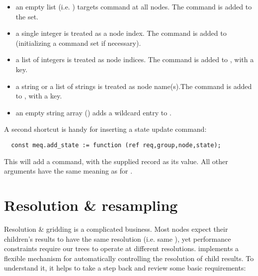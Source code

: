   \begin{itemize}  
  
  \item an empty list (i.e. \qq{[]}) targets command at all nodes. The command
  is added to the  set.
  
  \item a single integer is treated as a node index. The command is added
  to  (initializing a command set if necessary).
  
  \item a list of integers is treated as node indices. The command is added to
  , with a  key.
  
  \item a string or a list of strings is treated as node name(s).The command is
  added to , with a  key. 
  
  \item an empty string array () adds a wildcard entry to
  .

  \end{itemize}
  
  A second shortcut is handy for inserting a state update command:

  \begin{verbatim}
  const meq.add_state := function (ref req,group,node,state);
  \end{verbatim}
  
  This will add a  command, with the supplied  record as its
  value. All other arguments have the same meaning as for .

\section{Resolution \& resampling}
\label{sec:resampling}

  Resolution \& gridding is a complicated business. Most nodes expect their
  children's results to have the same resolution (i.e. same ), yet
  performance constraints require our trees to operate at different
  resolutions.  implements a flexible mechanism for automatically
  controlling the resolution of child results. To understand it, it helps to
  take a step back and review some basic requirements:

